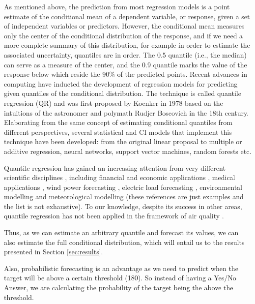 \documentclass[a4paper,twocolumn,5p]{elsarticle}
\begin{document}
As mentioned above, the prediction from most regression models is a
point estimate of the conditional mean of a dependent variable, or
response, given a set of independent variables or predictors. However,
the conditional mean measures only the center of the conditional
distribution of the response, and if we need a more complete summary
of this distribution, for example in order to estimate the associated
uncertainty, quantiles are in order. The 0.5 quantile (i.e., the
median) can serve as a measure of the center, and the 0.9 quantile
marks the value of the response below which reside the 90\% of the
predicted points. Recent advances in computing have inducted the
development of regression models for predicting given quantiles of the
conditional distribution. The technique is called quantile regression
(QR) and was first proposed by Koenker in 1978
\cite{koenker_regression_1978} based on the intuitions of the
astronomer and polymath Rudjer Boscovich in the 18th
century. Elaborating from the same concept of estimating conditional
quantiles from different perspectives, several statistical and CI
models that implement this technique have been developed: from the
original linear proposal to multiple or additive regression, neural
networks, support vector machines, random forests etc.

Quantile regression has gained an increasing attention from very
different scientific disciplines \cite{yu_quantile_2003}, including
financial and economic applications \cite{fitzenberger_economic_2002},
medical applications \cite{soyiri_forecasting_2012}, wind power
forecasting \cite{zhang_review_2014}, electric load forecasting
\cite{7423794,gibbons_quantile_2014}, environmental modelling
\cite{cade_gentle_2003} and meteorological modelling
\cite{bjornar_bremnes_probabilistic_2004} (these references are just
examples and the list is not exhaustive). To our knowledge, despite
its success in other areas, quantile regression has not been applied
in the framework of air quality%
.

Thus, as we can estimate an arbitrary quantile and forecast its
values, we can also estimate the full conditional distribution, which
will entail us to the results presented in Section \ref{sec:results}.

Also, probabilistic forecasting is an advantage as we need to predict 
when the target will be above a certain threshold (180). So instead of having a 
Yes/No Answer, we are calculating the probability of the target being the above 
the threshold.
\end{document}
